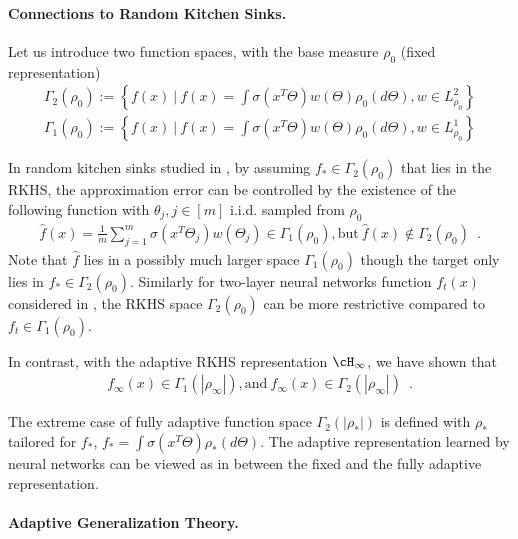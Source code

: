 \documentclass[11pt]{article}
\numberwithin{equation}{section}
\begin{document}
\paragraph{Connections to Random Kitchen Sinks.}
Let us introduce two function spaces, with the base measure $\rho_0$ (fixed representation)
\begin{align*}
    \Gamma_2(\rho_0):= \left\{ f(x)~|~ f(x) = \int \sigma(x^T\Theta) w(\Theta) \rho_0(d\Theta), w \in L^2_{\rho_0} \right\}
\end{align*}
\begin{align*}
    \Gamma_1(\rho_0):= \left\{ f(x)~|~ f(x) = \int \sigma(x^T\Theta) w(\Theta) \rho_0(d\Theta), w \in L^1_{\rho_0} \right\}
\end{align*}

In random kitchen sinks studied in \cite{rahimi2008random, rahimi2009weighted}, by assuming $f_* \in \Gamma_2(\rho_0)$ that lies in the RKHS, the approximation error can be controlled by the existence of the following function with $\theta_j, j \in [m]$ i.i.d. sampled from $\rho_0$ 
\begin{align*}
    \widehat{f}(x) = \frac{1}{m} \sum_{j=1}^m \sigma(x^T\Theta_j) w(\Theta_j)  \in \Gamma_1(\rho_0), \text{but} ~\widehat{f}(x) \notin \Gamma_2(\rho_0) \enspace.
\end{align*}
Note that $\widehat{f}$ lies in a possibly much larger space $\Gamma_1(\rho_0)$ though the target only lies in $f_* \in \Gamma_2(\rho_0)$. Similarly for two-layer neural networks function $f_t(x)$ considered in \cite[Section 2.3]{bach2017breaking}, the RKHS space $\Gamma_2(\rho_0)$ can be more restrictive compared to $f_t\in \Gamma_1(\rho_0)$. 

In contrast, with the adaptive RKHS representation $\cH_\infty$, we have shown that
\begin{align*}
    f_\infty(x) \in \Gamma_1(|\rho_\infty|), \text{and} ~f_\infty(x) \in \Gamma_2(|\rho_\infty|) \enspace.
\end{align*}


The extreme case of fully adaptive function space $\Gamma_2(|\rho_*|)$ is defined with $\rho_*$ tailored for $f_*$, $
    f_* = \int \sigma(x^T\Theta) \rho_*(d\Theta)$.
The adaptive representation learned by neural networks can be viewed as in between the fixed and the fully adaptive representation.




\paragraph{Adaptive Generalization Theory.}
\end{document}
